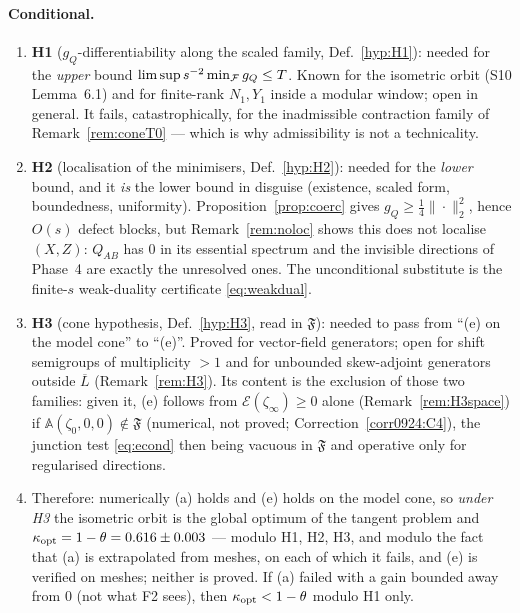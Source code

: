 \documentclass[11pt]{article}
\newcommand{\Aop}{\mathbb A}
\begin{document}
\paragraph{Conditional.}
\begin{enumerate}[leftmargin=1.8em,itemsep=1pt]
\item \textbf{H1} ($g_Q$-differentiability along the scaled family,
 Def.~\ref{hyp:H1}): needed for the \emph{upper} bound $\limsup s^{-2}\min_\mathcal F g_Q\le T$.
 Known for the isometric orbit (S10 Lemma~6.1) and for finite-rank $N_1,Y_1$ inside a
 modular window; open in general.  It fails, catastrophically, for the inadmissible
 contraction family of Remark~\ref{rem:coneT0} --- which is why admissibility is not a
 technicality.
\item \textbf{H2} (localisation of the minimisers, Def.~\ref{hyp:H2}): needed for the
 \emph{lower} bound, and it \emph{is} the lower bound in disguise (existence, scaled form,
 boundedness, uniformity).  Proposition~\ref{prop:coerc} gives $g_Q\ge\frac14\|\cdot\|_2^2$,
 hence $O(s)$ defect blocks, but Remark~\ref{rem:noloc} shows this does not localise
 $(X,Z)$: $Q_{AB}$ has $0$ in its essential spectrum and the invisible directions of
 Phase~4 are exactly the unresolved ones.  The unconditional substitute is the finite-$s$
 weak-duality certificate \eqref{eq:weakdual}.
\item \textbf{H3} (cone hypothesis, Def.~\ref{hyp:H3}, read in $\mathfrak F$): needed to
 pass from ``(e) on the model cone'' to ``(e)''.  Proved for vector-field generators; open
 for shift semigroups of multiplicity $>1$ and for unbounded skew-adjoint generators
 outside $\overline L$ (Remark~\ref{rem:H3}).  Its content is the exclusion of those two
 families: given it, (e) follows from $\mathcal E(\zeta_\infty)\ge0$ alone
 (Remark~\ref{rem:H3space}) if $\Aop(\zeta_0,0,0)\notin\mathfrak F$ (numerical, not proved; Correction~\ref{corr0924:C4}), the junction test \eqref{eq:econd} then being vacuous in
 $\mathfrak F$ and operative only for regularised directions.
\item Therefore: numerically (a) holds and (e) holds on the model cone, so \emph{under H3}
 the isometric orbit is the global optimum of the tangent problem and
 $\kappa_{\rm opt}=1-\theta=0.616\pm0.003$ --- modulo H1, H2, H3, and modulo the fact that
 (a) is extrapolated from meshes, on each of which it fails, and (e) is verified on meshes; neither is proved.  If (a) failed with a gain bounded away
 from $0$ (not what F2 sees), then $\kappa_{\rm opt}<1-\theta$ modulo H1 only.
\end{enumerate}
\end{document}
